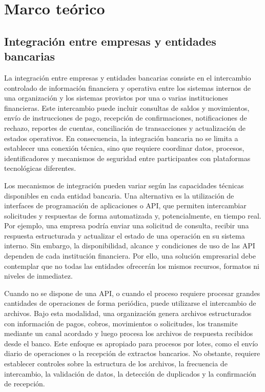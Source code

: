 \section{Marco teórico}

\subsection{Integración entre empresas y entidades bancarias}

La integración entre empresas y entidades bancarias consiste en el intercambio controlado de información financiera y operativa entre los sistemas internos de una organización y los sistemas provistos por una o varias instituciones financieras. Este intercambio puede incluir consultas de saldos y movimientos, envío de instrucciones de pago, recepción de confirmaciones, notificaciones de rechazo, reportes de cuentas, conciliación de transacciones y actualización de estados operativos. En consecuencia, la integración bancaria no se limita a establecer una conexión técnica, sino que requiere coordinar datos, procesos, identificadores y mecanismos de seguridad entre participantes con plataformas tecnológicas diferentes.

Los mecanismos de integración pueden variar según las capacidades técnicas disponibles en cada entidad bancaria. Una alternativa es la utilización de interfaces de programación de aplicaciones o API, que permiten intercambiar solicitudes y respuestas de forma automatizada y, potencialmente, en tiempo real. Por ejemplo, una empresa podría enviar una solicitud de consulta, recibir una respuesta estructurada y actualizar el estado de una operación en su sistema interno. Sin embargo, la disponibilidad, alcance y condiciones de uso de las API dependen de cada institución financiera. Por ello, una solución empresarial debe contemplar que no todas las entidades ofrecerán los mismos recursos, formatos ni niveles de inmediatez.

Cuando no se dispone de una API, o cuando el proceso requiere procesar grandes cantidades de operaciones de forma periódica, puede utilizarse el intercambio de archivos. Bajo esta modalidad, una organización genera archivos estructurados con información de pagos, cobros, movimientos o solicitudes, los transmite mediante un canal acordado y luego procesa los archivos de respuesta recibidos desde el banco. Este enfoque es apropiado para procesos por lotes, como el envío diario de operaciones o la recepción de extractos bancarios. No obstante, requiere establecer controles sobre la estructura de los archivos, la frecuencia de intercambio, la validación de datos, la detección de duplicados y la confirmación de recepción.


